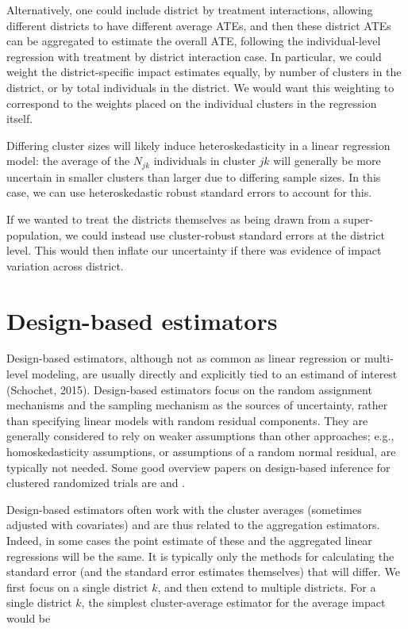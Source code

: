 \documentclass[12pt]{article}
\begin{document}
Alternatively, one could include district by treatment interactions, allowing different districts to have different average ATEs, and then these district ATEs can be aggregated to estimate the overall ATE, following the individual-level regression with treatment by district interaction case.
In particular, we could weight the district-specific impact estimates equally, by number of clusters in the district, or by total individuals in the district.
We would want this weighting to correspond to the weights placed on the individual clusters in the regression itself.

Differing cluster sizes will likely induce heteroskedasticity in a linear regression model: the average of the $N_{jk}$ individuals in cluster $jk$ will generally be more uncertain in smaller clusters than larger due to differing sample sizes.
In this case, we can use heteroskedastic robust standard errors to account for this.

If we wanted to treat the districts themselves as being drawn from a super-population, we could instead use cluster-robust standard errors at the district level.
This would then inflate our uncertainty if there was evidence of impact variation across district.








\section{Design-based estimators}\label{design-based-estimators}

Design-based estimators, although not as common as linear regression or multi-level modeling, are usually directly and explicitly tied to an estimand of interest (Schochet, 2015).
Design-based estimators focus on the random assignment mechanisms and the sampling mechanism as the
sources of uncertainty, rather than specifying linear models with random residual components.
They are generally considered to rely on weaker assumptions than other approaches; e.g., homoskedasticity assumptions, or assumptions of a random normal residual, are typically not needed.
Some good overview papers on design-based inference for clustered randomized trials are \citet{Schochet:clusterRCT, schochet2021design} and \citet{Middleton_clusterRCT}.

Design-based estimators often work with the cluster averages (sometimes adjusted with covariates) and are thus related to the aggregation estimators.
Indeed, in some cases the point estimate of these and the aggregated linear regressions will be the same.
It is typically only the methods for calculating the standard error (and the standard error estimates themselves) that will differ. 
We first focus on a single district $k$, and then extend to multiple districts.
For a single district $k$, the simplest cluster-average estimator for the average impact would be
\end{document}
